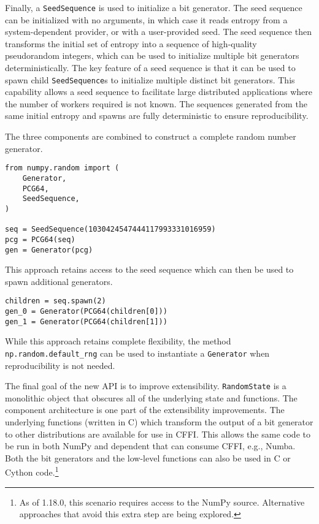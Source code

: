 \documentclass{article}
\begin{document}
Finally, a \texttt{SeedSequence} is used to initialize a bit generator. The seed
sequence can be initialized with no arguments, in which case it reads entropy
from a system-dependent provider, or with a user-provided seed. The seed
sequence then transforms the initial set of entropy into a sequence of
high-quality pseudorandom integers, which can be used to initialize multiple bit
generators deterministically. The key feature of a seed sequence is that
it can be used to spawn child \texttt{SeedSequence}s to initialize
multiple distinct bit generators.
This capability allows a seed sequence to facilitate large distributed applications
where the number of workers required is not known. The sequences generated from
the same initial entropy and spawns are fully deterministic to ensure
reproducibility.

The three components are combined to construct a complete random number
generator.

\begin{lstlisting}
from numpy.random import (
    Generator,
    PCG64,
    SeedSequence,
)

seq = SeedSequence(1030424547444117993331016959)
pcg = PCG64(seq)
gen = Generator(pcg)
\end{lstlisting}

This approach retains access to the seed sequence which can then be
used to spawn additional generators.

\begin{lstlisting}
children = seq.spawn(2)
gen_0 = Generator(PCG64(children[0]))
gen_1 = Generator(PCG64(children[1]))
\end{lstlisting}

While this approach retains complete flexibility, the method
\texttt{np.random.default\_rng} can be used to instantiate a \texttt{Generator} when
reproducibility is not needed.

The final goal of the new API is to improve extensibility. \texttt{RandomState} is
a monolithic object that obscures all of the underlying state and functions. The
component architecture is one part of the extensibility improvements. The
underlying functions (written in C) which transform the output of a bit
generator to other distributions are available for use in CFFI. This allows the
same code to be run in both NumPy and dependent that can consume CFFI, e.g.,
Numba. Both the bit generators and the low-level functions can also be used in C
or Cython code.\footnote{As of 1.18.0, this scenario requires access to the
NumPy source. Alternative approaches that avoid this extra step are being
explored.}
\end{document}
